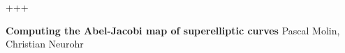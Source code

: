\documentclass[11pt,a4paper]{article}
\def\biblio{}
\begin{document}
\def\biblio{}+++

\tableofcontents
\newpage

\begin{center}
  {\bf \huge Computing the Abel-Jacobi map of superelliptic curves} \abstandl
  Pascal Molin, Christian Neurohr
\end{center}
\newpage


















\newpage


\end{document}
